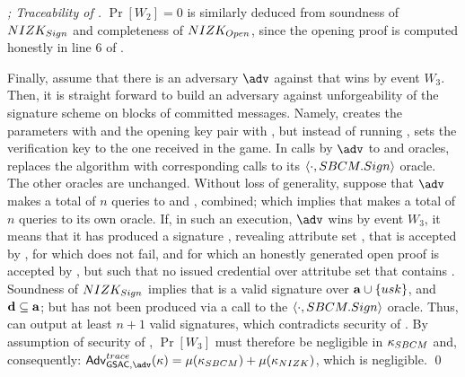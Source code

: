 \begin{proof}[; Traceability of \GSACGen]
  $\Pr[W_2] = 0$ is similarly deduced from soundness of $NIZK_{Sign}$ and
  completeness of $NIZK_{Open}$, since the opening proof is computed
  honestly in line 6 of \ExpGSACTrace.

  Finally, assume that there is an adversary $\adv$ against \ExpGSACTrace that
  wins by event $W_3$. Then, it is straight forward to build an adversary \advB
  against unforgeability of the signature scheme on blocks of committed
  messages. Namely, \advB creates the parameters with \Setup and the opening
  key pair with \OKeyGen, but instead of running \IKeyGen, sets the verification
  key to the one received in the \ExpSBCMOMF game. In calls by $\adv$ to \OBTISS
  and \ISSUE oracles, \advB replaces the \Issue algorithm with corresponding
  calls to its $\langle \cdot,SBCM.Sign \rangle$ oracle. The other oracles are
  unchanged. Without loss of generality, suppose that $\adv$ makes a total of
  $n$ queries to \OBTISS and \ISSUE, combined; which implies that \advB makes
  a total of $n$ queries to its own oracle. If, in such an execution, $\adv$
  wins by event $W_3$, it means that it has produced a signature \sig, revealing
  attribute set \dattrs, that is accepted by \Verify, for which \Open does not
  fail, and for which an honestly generated open proof is accepted by \Judge,
  but such that no issued credential over attritube set \attrs that contains
  \dattrs. Soundness of $NIZK_{Sign}$ implies that \sig is a valid signature
  over $\mathbf{a} \cup \lbrace usk \rbrace$, and $\mathbf{d} \subseteq \mathbf{a}$; but
  \sig has not been produced via a call to the $\langle \cdot,SBCM.Sign \rangle$
  oracle. Thus, \advB can output at least $n+1$ valid signatures, which
  contradicts security of \SBCM.
  By assumption of security of \SBCM, $\Pr[W_3]$ must therefore be negligible in
  $\kappa_{SBCM}$ and, consequently: $\AdvGSACTrace(\secpar) = \negl(\SBCMsecpar)+
  \negl(\NIZKsecpar)$, which is negligible.  
  \qed
\end{proof}

